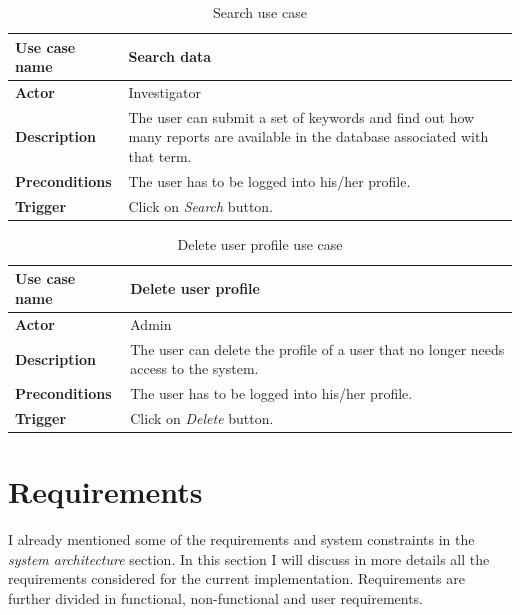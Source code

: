 \begin{table}[H]
\centering
\begin{tabular}{l p{9cm}}  
\toprule
\bf{Use case name}    & Search data \\
\midrule
\bf{Actor}    & Investigator \\
\midrule
\bf{Description}    & The user can submit a set of keywords and find out how
many reports are available in the database associated with that term.
\\
\midrule
\bf{Preconditions}    & The user has to be logged into his/her profile.
\\
\midrule
\bf{Trigger}    & Click on \emph{Search} button. \\
\bottomrule
\end{tabular}
\caption{Search use case}
\end{table}

\begin{table}[H]
\centering
\begin{tabular}{l p{9cm}}  
\toprule
\bf{Use case name}    & Delete user profile \\
\midrule
\bf{Actor}    & Admin \\
\midrule
\bf{Description}    & The user can delete the profile of a user that no longer
needs access to the system.
\\
\midrule
\bf{Preconditions}    & The user has to be logged into his/her profile.
\\
\midrule
\bf{Trigger}    & Click on \emph{Delete} button. \\
\bottomrule
\end{tabular}
\caption{Delete user profile use case}
\end{table}

\section{Requirements}
I already mentioned some of the requirements and system constraints in the
\emph{system architecture} section. In this section I will discuss in more
details all the requirements considered for the current implementation.
Requirements are further divided in functional, non-functional and user
requirements.

